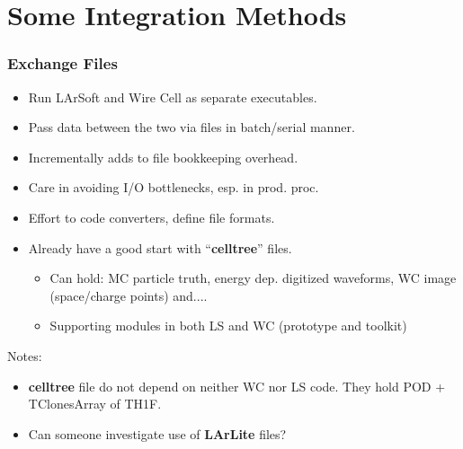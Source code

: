 \documentclass[xcolor=dvipsnames]{beamer}
\begin{document}
\section{Some Integration Methods}

\begin{frame}
\end{frame}

\begin{frame}
  \frametitle{Exchange Files}

  \begin{itemize}
  \item Run LArSoft and Wire Cell as separate executables.
  \item Pass data between the two via files in batch/serial manner.
  \item Incrementally adds to file bookkeeping overhead.
  \item Care in avoiding I/O bottlenecks, esp. in prod. proc.
  \item Effort to code converters, define file formats.
  \item Already have a good start with ``\textbf{celltree}'' files.
    \begin{itemize}\footnotesize
    \item Can hold: MC particle truth, energy dep. digitized waveforms, WC image (space/charge points) and....
    \item Supporting modules in both LS and WC (prototype and toolkit) 
    \end{itemize}
  \end{itemize}

  Notes:
  \begin{itemize}
  \item \textbf{celltree} file do not depend on neither WC nor LS
    code.  They hold POD + TClonesArray of TH1F.
  \item Can someone investigate use of \textbf{LArLite} files?
  \end{itemize}


\end{frame}
\end{document}
